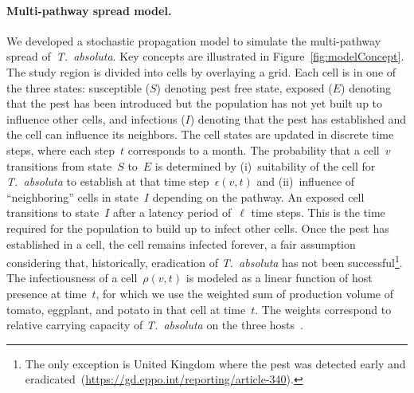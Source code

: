 \documentclass[11pt]{article}
\newcommand{\tuta}{\emph{T.~absoluta}}
\newcommand{\infest}{\rho}
\newcommand{\suitable}{\epsilon}
\theoremstyle{definition}
\begin{document}
\paragraph{Multi-pathway spread model.} We developed a stochastic
propagation model to simulate the multi-pathway spread of~\tuta{}. Key
concepts are illustrated in Figure~\ref{fig:modelConcept}. The study region
is divided into cells by overlaying a grid. Each cell is in one of the
three states: susceptible ($S$) denoting pest free state, exposed ($E$)
denoting that the pest has been introduced but the population has not yet
built up to influence other cells, and infectious ($I$) denoting that the
pest has established and the cell can influence its neighbors. The cell
states are updated in discrete time steps, where each step~$t$ corresponds
to a month.  The probability that a cell~$v$ transitions from state~$S$
to~$E$ is determined by (i)~suitability of the cell for \tuta{} to
establish at that time step~$\suitable(v,t)$ and (ii)~influence of
``neighboring'' cells in state~$I$ depending on the pathway. An exposed
cell transitions to state~$I$ after a latency period of~$\ell$ time steps.
This is the time required for the population to build up to infect other
cells. Once the pest has established in a cell, the cell remains infected
forever, a fair assumption considering that, historically, eradication of
\tuta{} has not been successful\footnote{The only exception is United
Kingdom where the pest was detected early and
eradicated~(\url{https://gd.eppo.int/reporting/article-340}).}. The
infectiousness of a cell~$\infest(v,t)$ is modeled as a linear function of
host presence at time~$t$, for which we use the weighted sum of production
volume of tomato, eggplant, and potato in that cell at time~$t$. The
weights correspond to relative carrying capacity of \tuta{} on the three
hosts~\cite{sylla2018}.
\end{document}
